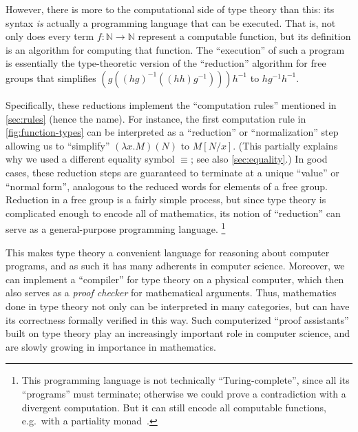 \documentclass[10pt]{article}
\let\jdeq\equiv
\def\N{\mathbb{N}}
\def\equiv{\mathsf{Equiv}}
\numberwithin{equation}{section}
\begin{document}
However, there is more to the computational side of type theory than this: its syntax \emph{is} actually a programming language that can be executed.
That is, not only does every term $f:\N\to\N$ represent a computable function, but its definition is an algorithm for computing that function.
The ``execution'' of such a program is essentially the type-theoretic version of the ``reduction'' algorithm for free groups that simplifies $(g((hg)^{-1}((hh)g^{-1})))h^{-1}$ to $hg^{-1}h^{-1}$.

Specifically, these reductions implement the ``computation rules'' mentioned in \cref{sec:rules} (hence the name).
For instance, the first computation rule in \cref{fig:function-types} can be interpreted as a ``reduction'' or ``normalization'' step allowing us to ``simplify'' $(\lambda x.M)(N)$ to $M[N/x]$.
(This partially explains why we used a different equality symbol $\jdeq$; see also \cref{sec:equality}.)
In good cases, these reduction steps are guaranteed to terminate at a unique ``value'' or ``normal form'', analogous to the reduced words for elements of a free group.
Reduction in a free group is a fairly simple process, but since type theory is complicated enough to encode all of mathematics, its notion of ``reduction'' can serve as a general-purpose programming language.%
\footnote{This programming language is not technically ``Turing-complete'', since all its ``programs'' must terminate; otherwise we could prove a contradiction with a divergent computation.
But it can still encode all computable functions, e.g.\ with a partiality monad~\cite{capretta:genrec-coind,danielsson:opsem-partiality}.}

This makes type theory a convenient language for reasoning about computer programs, and as such it has many adherents in computer science.
Moreover, we can implement a ``compiler'' for type theory on a physical computer, which then also serves as a \emph{proof checker} for mathematical arguments.
Thus, mathematics done in type theory not only can be interpreted in many categories, but can have its correctness formally verified in this way.
Such computerized ``proof assistants'' built on type theory play an increasingly important role in computer science, and are slowly growing in importance in mathematics.
\end{document}
